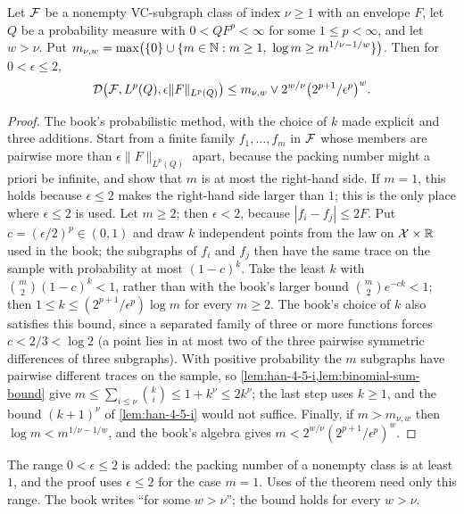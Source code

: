 \begin{theorem}
  \label{thm:han-4-11}
  Let $\mathcal{F}$ be a nonempty VC-subgraph class of index $\nu\ge1$ with an envelope $F$, let $Q$ be a probability measure with $0<QF^p<\infty$ for some $1\le p<\infty$, and let $w>\nu$. Put $m_{\nu,w}=\max\bigl(\{0\}\cup\{m\in\Nat:m\ge1,\ \log m\ge m^{1/\nu-1/w}\}\bigr)$. Then for $0<\epsilon\le2$,
  \[
    \mathcal{D}\bigl(\mathcal{F},L^p(Q),\epsilon\|F\|_{L^p(Q)}\bigr)\le m_{\nu,w}\vee2^{w/\nu}\bigl(2^{p+1}/\epsilon^p\bigr)^w.
  \]
\end{theorem}
\begin{proof}
  The book's probabilistic method, with the choice of $k$ made explicit and three additions. Start from a finite family $f_1,\dots,f_m$ in $\mathcal{F}$ whose members are pairwise more than $\epsilon\|F\|_{L^p(Q)}$ apart, because the packing number might a priori be infinite, and show that $m$ is at most the right-hand side. If $m=1$, this holds because $\epsilon\le2$ makes the right-hand side larger than $1$; this is the only place where $\epsilon\le2$ is used. Let $m\ge2$; then $\epsilon<2$, because $|f_i-f_j|\le2F$. Put $c=(\epsilon/2)^p\in(0,1)$ and draw $k$ independent points from the law on $\mathcal{X}\times\mathbb{R}$ used in the book; the subgraphs of $f_i$ and $f_j$ then have the same trace on the sample with probability at most $(1-c)^k$. Take the least $k$ with $\binom m2(1-c)^k<1$, rather than with the book's larger bound $\binom m2e^{-ck}<1$; then $1\le k\le(2^{p+1}/\epsilon^p)\log m$ for every $m\ge2$. The book's choice of $k$ also satisfies this bound, since a separated family of three or more functions forces $c<2/3<\log2$ (a point lies in at most two of the three pairwise symmetric differences of three subgraphs). With positive probability the $m$ subgraphs have pairwise different traces on the sample, so \cref{lem:han-4-5-i,lem:binomial-sum-bound} give $m\le\sum_{i\le\nu}\binom ki\le1+k^\nu\le2k^\nu$; the last step uses $k\ge1$, and the bound $(k+1)^\nu$ of \cref{lem:han-4-5-i} would not suffice. Finally, if $m>m_{\nu,w}$ then $\log m<m^{1/\nu-1/w}$, and the book's algebra gives $m<2^{w/\nu}(2^{p+1}/\epsilon^p)^w$.
\end{proof}
\begin{remark}
  The range $0<\epsilon\le2$ is added: the packing number of a nonempty class is at least $1$, and the proof uses $\epsilon\le2$ for the case $m=1$. Uses of the theorem need only this range. The book writes ``for some $w>\nu$''; the bound holds for every $w>\nu$.
\end{remark}

